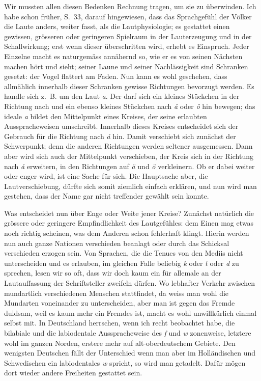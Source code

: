{\largerpage[-1]Wir mussten allen diesen Bedenken Rechnung tragen, um sie zu überwinden. Ich habe schon früher, S.~33, darauf hingewiesen, dass das Sprachge\label{sp.188}fühl der Völker die Laute anders, weiter fasst, als die Lautphysiologie; es gestattet einen gewissen, grösseren oder geringeren Spielraum in der Lauterzeugung und in der Schallwirkung; erst wenn dieser überschritten wird, erhebt es Einspruch. Jeder Einzelne macht es naturgemäss annähernd so, wie er es von seinen Nächsten machen hört und sieht; seiner Laune und seiner Nachlässigkeit sind Schranken gesetzt: der Vogel flattert am Faden. Nun kann es wohl geschehen, dass allmählich innerhalb dieser Schranken gewisse Richtungen bevorzugt werden. Es handle sich z.~B. um den Laut \textit{a}. Der darf sich ein kleines Stückchen in der Richtung nach  und ein ebenso kleines Stückchen nach \textit{å} oder \textit{ö} hin bewegen; das ideale \textit{a} bildet den Mittelpunkt eines Kreises, der seine erlaubten Ausspracheweisen umschreibt. Innerhalb dieses \label{fp.199} Kreises entscheidet sich der Gebrauch für die Richtung nach \textit{å} hin. Damit verschiebt sich zunächst der Schwerpunkt; denn die anderen Richtungen werden seltener ausgemessen. Dann aber wird sich auch der Mittelpunkt verschieben, der Kreis sich in der Richtung nach \textit{å} erweitern, in den Richtungen auf \textit{ä} und \textit{ö} verkleinern. Ob er dabei weiter oder enger wird, ist eine Sache für sich. Die Hauptsache aber, die Lautverschiebung, dürfte sich somit ziemlich einfach erklären, und nun wird man gestehen, dass der Name gar nicht treffender gewählt sein konnte.

Was entscheidet nun über Enge oder Weite jener Kreise? Zunächst natürlich die grössere oder geringere Empfindlichkeit des Lautgefühles: dem Einen mag etwas noch richtig scheinen, was dem Anderen schon fehlerhaft klingt. Hierin werden nun auch ganze Nationen verschieden beanlagt oder durch das Schicksal verschieden erzogen sein. Von Sprachen, die die Tenues von den Mediis nicht unterscheiden und es erlauben, im gleichen Falle beliebig \textit{k} oder  \textit{t} oder \textit{d} zu sprechen, lesen wir so oft, dass wir doch kaum ein für allemale an der Lautauffassung der Schriftsteller zweifeln dürfen. Wo lebhafter Verkehr zwischen mundartlich verschiedenen Menschen stattfindet, da weiss man wohl die Mundarten voneinander zu unterscheiden, aber man ist gegen das Fremde duldsam, weil es kaum mehr ein Fremdes ist, macht es wohl unwillkürlich einmal selbst mit. In Deutschland herrschen, wenn ich recht beobachtet habe, die bilabiale und die labiodentale Ausspracheweise des \textit{f} und \textit{w} zonenweise, letztere wohl im ganzen Norden, erstere mehr auf alt-oberdeutschem Gebiete. Den wenigsten Deutschen fällt der Unterschied  wenn man aber im Holländischen und Schwedischen ein labiodentales \textit{w} spricht, so wird man getadelt. Dafür mögen dort wieder andere Freiheiten gestattet sein.

}
